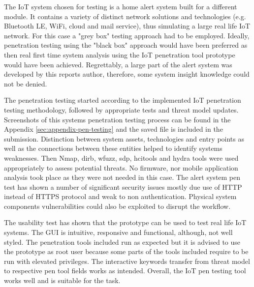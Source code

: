 	The IoT system chosen for testing is a home alert system built for a different module. It contains a variety of distinct network solutions and technologies (e.g. Bluetooth LE, WiFi, cloud and mail service), thus simulating a large real life IoT network. For this case a "grey box" testing approach had to be employed. Ideally, penetration testing using the "black box" approach would have been preferred as then real first time system analysis using the IoT penetration tool prototype would have been achieved. Regrettably, a large part of the alert system was developed by this reports author, therefore, some system insight knowledge could not be denied. 

	The penetration testing started according to the implemented IoT penetration testing methodology, followed by appropriate tests and threat model updates. Screenshots of this systems penetration testing process can be found in the Appendix \ref{sec:appendix-pen-testing} and the saved file is included in the submission. 
	Distinction between system assets, technologies and entry points as well as the connections between these entities helped to identify systems weaknesses. Then Nmap, dirb, wfuzz, sdp, hcitools and hydra tools were used appropriately to assess potential threats. No firmware, nor mobile application analysis took place as they were not needed in this case.
	The alert system pen test has shown a number of significant security issues mostly due use of HTTP instead of HTTPS protocol and weak to non authentication. Physical system components vulnerabilities could also be exploited to disrupt the workflow. 
	
	The usability test has shown that the prototype can be used to test real life IoT systems. The GUI is intuitive, responsive and functional, although, not well styled. The penetration tools included run as expected but it is advised to use the prototype as root user because some parts of the tools included require to be run with elevated privileges. The interactive keywords transfer from threat model to respective pen tool fields works as intended. Overall, the IoT pen testing tool works well and is suitable for the task.
